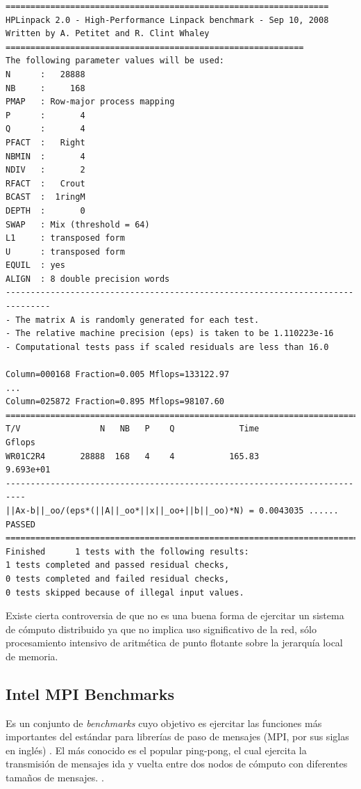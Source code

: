 \documentclass[a4paper]{report}
\begin{document}
{\small
\begin{verbatim}
=================================================================
HPLinpack 2.0 - High-Performance Linpack benchmark - Sep 10, 2008
Written by A. Petitet and R. Clint Whaley
============================================================
The following parameter values will be used:
N      :   28888
NB     :     168
PMAP   : Row-major process mapping
P      :       4
Q      :       4
PFACT  :   Right
NBMIN  :       4
NDIV   :       2
RFACT  :   Crout
BCAST  :  1ringM
DEPTH  :       0
SWAP   : Mix (threshold = 64)
L1     : transposed form
U      : transposed form
EQUIL  : yes
ALIGN  : 8 double precision words
-------------------------------------------------------------------------------
- The matrix A is randomly generated for each test.
- The relative machine precision (eps) is taken to be 1.110223e-16
- Computational tests pass if scaled residuals are less than 16.0

Column=000168 Fraction=0.005 Mflops=133122.97
...
Column=025872 Fraction=0.895 Mflops=98107.60
==========================================================================
T/V                N   NB   P    Q             Time                 Gflops
WR01C2R4       28888  168   4    4           165.83              9.693e+01
--------------------------------------------------------------------------
||Ax-b||_oo/(eps*(||A||_oo*||x||_oo+||b||_oo)*N) = 0.0043035 ...... PASSED
==========================================================================
Finished      1 tests with the following results:
1 tests completed and passed residual checks,
0 tests completed and failed residual checks,
0 tests skipped because of illegal input values.
\end{verbatim}
}

\bigskip

Existe cierta controversia de que no es una buena forma de ejercitar un
sistema de cómputo distribuido ya que no implica uso significativo de la
red, sólo procesamiento intensivo de aritmética de punto flotante
sobre la jerarquía local de memoria.

\subsection{Intel MPI Benchmarks}

Es un conjunto de {\it benchmarks} cuyo objetivo es ejercitar las funciones
más importantes del estándar para librerías de paso de mensajes (MPI, por sus siglas en inglés) \cite{mpi}.
El más conocido es el popular ping-pong, el cual ejercita la transmisión de mensajes ida y vuelta entre dos nodos de
cómputo con diferentes tamaños de mensajes. \cite{latency}.
\end{document}
